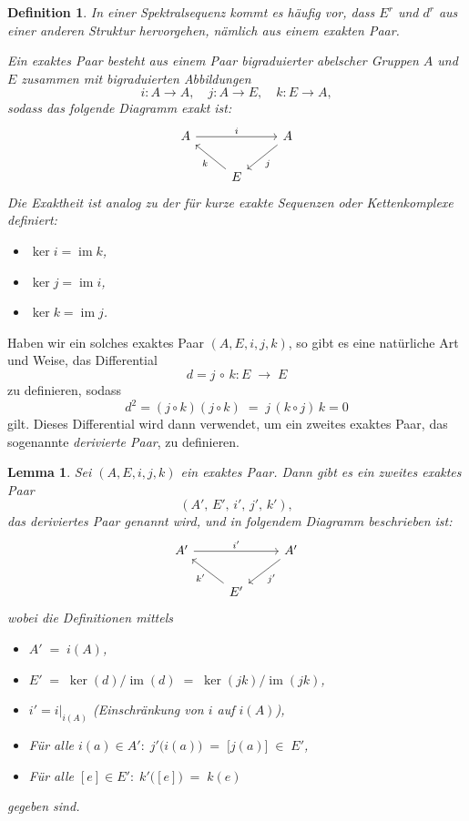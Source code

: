 \documentclass[12pt, hidelinks]{article}
\numberwithin{conj}{section}
\newtheorem{definition}[conj]{Definition}
\newtheorem{lemma}[conj]{Lemma}
\newcommand{\ima}{\operatorname{im}}
\begin{document}
\begin{definition}
    In einer Spektralsequenz kommt es häufig vor, dass $E^r$ und $d^r$ aus einer anderen Struktur hervorgehen, nämlich aus einem \emph{exakten Paar}.
    
    Ein \emph{exaktes Paar} besteht aus einem Paar bigraduierter abelscher Gruppen $A$ und $E$ zusammen mit bigraduierten Abbildungen
    \[
        i : A \to A,
        \quad
        j : A \to E,
        \quad
        k : E \to A,
    \]
    sodass das folgende Diagramm exakt ist:
    \[
        \begin{tikzcd}
            A && A \\
            & E
            \arrow["i", from=1-1, to=1-3]
            \arrow["j", from=1-3, to=2-2]
            \arrow["k", from=2-2, to=1-1]
        \end{tikzcd}
    \]
    Die \emph{Exaktheit} ist analog zu der für kurze exakte Sequenzen oder Kettenkomplexe definiert:
    \begin{itemize}[nolistsep]
        \item $\ker i = \ima k$,
        \item $\ker j = \ima i$,
        \item $\ker k = \ima j$.
    \end{itemize}
\end{definition}

Haben wir ein solches exaktes Paar $(A,E,i,j,k)$, so gibt es eine natürliche Art und Weise, das Differential
\[
    d = j \,\circ\, k : E \;\longrightarrow\; E
\]
zu definieren, sodass
\[
    d^2 = (j \circ k)(j \circ k) \;=\; j\,(k \circ j)\,k = 0
\]
gilt. Dieses Differential wird dann verwendet, um ein zweites exaktes Paar, das sogenannte \emph{derivierte Paar}, zu definieren.

\begin{lemma}
    Sei $(A,E,i,j,k)$ ein exaktes Paar. Dann gibt es ein zweites exaktes Paar
    \[
        (A',\,E',\,i',\,j',\,k'),
    \]
    das \emph{deriviertes Paar} genannt wird, und in folgendem Diagramm beschrieben ist:
    \[
        \begin{tikzcd}
            A' && A' \\
            & E'
            \arrow["i'", from=1-1, to=1-3]
            \arrow["j'", from=1-3, to=2-2]
            \arrow["k'", from=2-2, to=1-1]
        \end{tikzcd}
    \]
    wobei die Definitionen mittels
    \begin{itemize}[nolistsep]
        \item $A' \;=\; i(A)$,
        \item $E' \;=\; \ker(d)\big/\ima(d) \;=\; \ker(jk)\big/\ima(jk)$,
        \item $i' = i\vert_{i(A)}$ (Einschränkung von $i$ auf $i(A)$),
        \item Für alle $i(a) \in A':\; j'\bigl(i(a)\bigr) \;=\; \bigl[j(a)\bigr] \;\in\; E'$,
        \item Für alle $[e] \in E':\; k'\bigl([e]\bigr) \;=\; k(e)$
    \end{itemize}
    gegeben sind.
\end{lemma}
\end{document}
